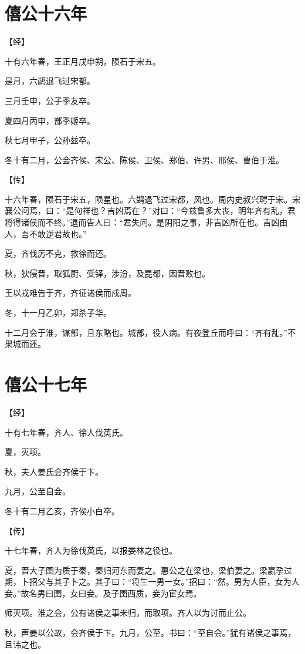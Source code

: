 \documentclass[a4paper,12pt,UTF8,twoside]{ctexbook}
\begin{document}
\section{僖公十六年}



【经】

十有六年春，王正月戊申朔，陨石于宋五。

是月，六鹢退飞过宋都。

三月壬申，公子季友卒。

夏四月丙申，鄫季姬卒。

秋七月甲子，公孙兹卒。

冬十有二月，公会齐侯、宋公、陈侯、卫侯、郑伯、许男、邢侯、曹伯于淮。

【传】

十六年春，陨石于宋五，陨星也。六鹢退飞过宋都，风也。周内史叔兴聘于宋。宋襄公问焉，曰：“是何祥也？吉凶焉在？”对曰：“今兹鲁多大丧，明年齐有乱，君将得诸侯而不终。”退而告人曰：“君失问。是阴阳之事，非吉凶所在也。吉凶由人，吾不敢逆君故也。”

夏，齐伐厉不克，救徐而还。

秋，狄侵晋，取狐厨、受铎，涉汾，及昆都，因晋败也。

王以戎难告于齐，齐征诸侯而戍周。

冬，十一月乙卯，郑杀子华。

十二月会于淮，谋鄫，且东略也。城鄫，役人病。有夜登丘而呼曰：“齐有乱。”不果城而还。


\section{僖公十七年}


【经】

十有七年春，齐人、徐人伐英氏。

夏，灭项。

秋，夫人姜氏会齐侯于卞。

九月，公至自会。

冬十有二月乙亥，齐侯小白卒。

【传】

十七年春，齐人为徐伐英氏，以报娄林之役也。

夏，晋大子圉为质于秦，秦归河东而妻之。惠公之在梁也，梁伯妻之。梁嬴孕过期，卜招父与其子卜之。其子曰：“将生一男一女。”招曰：“然。男为人臣，女为人妾。”故名男曰圉，女曰妾。及子圉西质，妾为宦女焉。

师灭项。淮之会，公有诸侯之事未归，而取项。齐人以为讨而止公。

秋，声姜以公故，会齐侯于卞。九月，公至。书曰：“至自会。”犹有诸侯之事焉，且讳之也。
\end{document}
